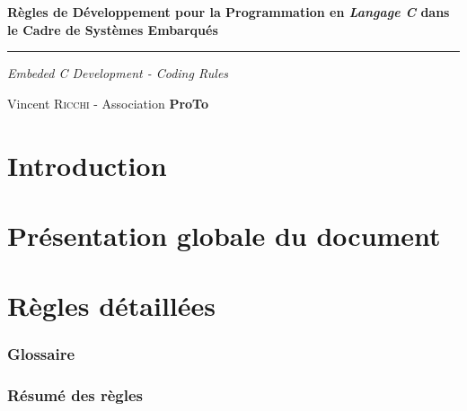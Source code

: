 \documentclass[a4paper, titlepage]{article}
\begin{document}
\begin{titlepage}
  \selectfont
  \begin{flushleft}\huge\bfseries
    Règles de Développement pour la Programmation en \textit{Langage C} dans le Cadre de Systèmes Embarqués
  \end{flushleft}
  \hrule
  \begin{flushright}\LARGE
    \textit{Embeded C Development - Coding Rules}
  \end{flushright}
  \begin{center}
    Vincent \textsc{Ricchi} - Association \textbf{ProTo}
  \end{center}
\end{titlepage}



\tableofcontents

\pagebreak

\part{Introduction}


\part{Présentation globale du document}


\part{Règles détaillées}








\appendix

\listoffigures              %
\listoftables               %
\pagebreak

\section{Glossaire}


\pagebreak

\section{Résumé des règles}

\end{document}
